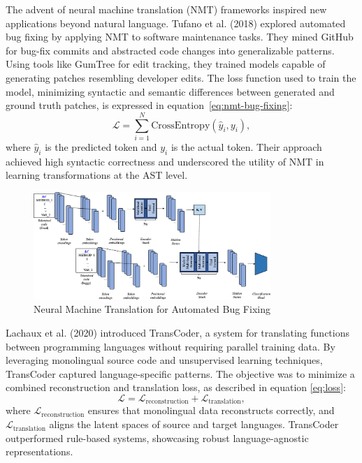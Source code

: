 \documentclass{dhbenelux}
\begin{document}
The advent of neural machine translation (NMT) frameworks inspired new applications beyond natural language. Tufano et al. (2018) \cite{tufano2018} explored automated bug fixing by applying NMT to software maintenance tasks. They mined GitHub for bug-fix commits and abstracted code changes into generalizable patterns. Using tools like GumTree for edit tracking, they trained models capable of generating patches resembling developer edits. The loss function used to train the model, minimizing syntactic and semantic differences between generated and ground truth patches, is expressed in equation~\ref{eq:nmt-bug-fixing}:
\begin{equation}
\mathcal{L} = \sum_{i=1}^N \text{CrossEntropy}(\hat{y}_i, y_i),
\label{eq:nmt-bug-fixing}
\end{equation}
where \( \hat{y}_i \) is the predicted token and \( y_i \) is the actual token. Their approach achieved high syntactic correctness and underscored the utility of NMT in learning transformations at the AST level.
\begin{figure}[h]
    \centering
    \includegraphics[width=0.8\textwidth]{Images/3.png} %
    \caption{Neural Machine Translation for Automated Bug Fixing}
    \label{fig:nmt-bug-fixing}
\end{figure}

Lachaux et al. (2020) \cite{lachaux2020} introduced TransCoder, a system for translating functions between programming languages without requiring parallel training data. By leveraging monolingual source code and unsupervised learning techniques, TransCoder captured language-specific patterns. The objective was to minimize a combined reconstruction and translation loss, as described in equation \ref{eq:loss}:
\begin{equation}
\mathcal{L} = \mathcal{L}_{\text{reconstruction}} + \mathcal{L}_{\text{translation}},
\label{eq:loss}
\end{equation}
where \( \mathcal{L}_{\text{reconstruction}} \) ensures that monolingual data reconstructs correctly, and \( \mathcal{L}_{\text{translation}} \) aligns the latent spaces of source and target languages. TransCoder outperformed rule-based systems, showcasing robust language-agnostic representations.
\end{document}
